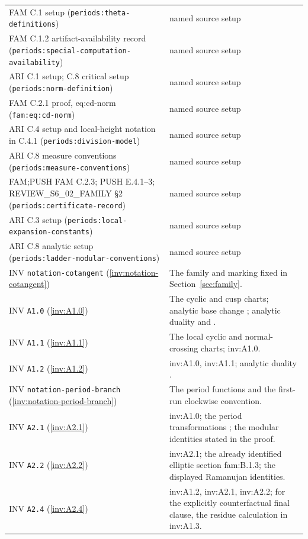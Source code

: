 \begin{longtable}{@{}L{.21\linewidth}L{.73\linewidth}@{}}
FAM C.1 setup (\nolinkurl{periods:theta-definitions}) & named source setup\\
FAM C.1.2 artifact-availability record (\nolinkurl{periods:special-computation-availability}) & named source setup\\
ARI C.1 setup; C.8 critical setup (\nolinkurl{periods:norm-definition}) & named source setup\\
FAM C.2.1 proof, eq:\allowbreak{}cd-norm (\nolinkurl{fam:eq:cd-norm}) & named source setup\\
ARI C.4 setup and local-height notation in C.4.1 (\nolinkurl{periods:division-model}) & named source setup\\
ARI C.8 measure conventions (\nolinkurl{periods:measure-conventions}) & named source setup\\
FAM;PUSH FAM C.2.3; PUSH E.4.1--3; REVIEW\_\allowbreak{}S6\_\allowbreak{}02\_\allowbreak{}FAMILY §2 (\nolinkurl{periods:certificate-record}) & named source setup\\
ARI C.3 setup (\nolinkurl{periods:local-expansion-constants}) & named source setup\\
ARI C.8 analytic setup (\nolinkurl{periods:ladder-modular-conventions}) & named source setup\\
INV \nolinkurl{notation-cotangent} (\ref{inv:notation-cotangent}) & The family and marking fixed in Section~\ref{sec:family}.\\
INV \nolinkurl{A1.0} (\ref{inv:A1.0}) & The cyclic and cusp charts; analytic base change \cite[III.4.10, III.4.12]{BS76}; analytic duality \cite[pp.~261, 264--266]{RRV71} and \cite[p.~91, Proposition~2]{RR70}.\\
INV \nolinkurl{A1.1} (\ref{inv:A1.1}) & The local cyclic and normal-crossing charts; inv:A1.0.\\
INV \nolinkurl{A1.2} (\ref{inv:A1.2}) & inv:A1.0, inv:A1.1; analytic duality \cite[pp.~261, 264--266]{RRV71}.\\
INV \nolinkurl{notation-period-branch} (\ref{inv:notation-period-branch}) & The period functions and the first-run clockwise convention.\\
INV \nolinkurl{A2.1} (\ref{inv:A2.1}) & inv:A1.0; the period transformations \cite[Definition 3.1 and Theorem 3.4(i)]{AC26}; the modular identities stated in the proof.\\
INV \nolinkurl{A2.2} (\ref{inv:A2.2}) & inv:A2.1; the already identified elliptic section fam:B.1.3; the displayed Ramanujan identities.\\
INV \nolinkurl{A2.4} (\ref{inv:A2.4}) & inv:A1.2, inv:A2.1, inv:A2.2; for the explicitly counterfactual final clause, the residue calculation in inv:A1.3.\\

\end{longtable}

